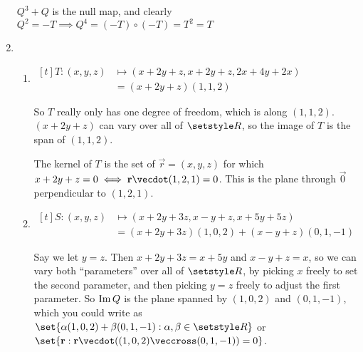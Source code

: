 \documentclass[fleqn,a4paper,11pt]{article}
\begin{document}
\begin{enumerate}[label=\textbf{\arabic*.}]
    \(Q^3 + Q\) is the null map, and clearly
    \(Q^2 = -T \implies Q^4 = (-T) \circ (-T) = T^2 = T\)
   \item
    \begin{enumerate}[label=(\alph*)]
     \item \(
      \begin{aligned}[t]
       T : (x, y, z) &\mapsto (x + 2y + z, x + 2y + z, 2x + 4y + 2x) \\
                     &= (x + 2y + z)(1, 1, 2)
      \end{aligned} \)

      So \(T\) really only has one degree of freedom, which is along
      \((1, 1, 2)\). \((x + 2y + z)\) can vary over all of \(\Reals\), so the
      image of \(T\) is the span of \((1, 1, 2)\).

      The kernel of \(T\) is the set of \(\vec r = (x, y, z)\) for which
      \(x + 2y + z = 0 \iff \vec r \vecdot (1, 2, 1) = 0\). This is the plane
      through \(\vec 0\) perpendicular to \((1, 2, 1)\).
     \item \(
      \begin{aligned}[t]
       S: (x, y, z) &\mapsto (x + 2y + 3z, x - y + z, x + 5y + 5z) \\
                    &= (x + 2y + 3z)(1, 0, 2) + (x - y + z)(0, 1, -1)
      \end{aligned} \)

      Say we let \(y = z\). Then \(x + 2y + 3z = x + 5y\) and \(x - y + z = x\),
      so we can vary both ``parameters'' over all of \(\Reals\), by picking
      \(x\) freely to set the second parameter, and then picking \(y = z\)
      freely to adjust the first parameter. So \(\operatorname{Im} Q\) is the plane spanned
      by \((1, 0, 2)\) and \((0, 1, -1)\), which you could write as
      \(\set{\alpha (1, 0, 2) + \beta (0, 1, -1) : \alpha, \beta \in \Reals}\)
      or \(\set{\vec r : \vec r \vecdot ((1, 0, 2) \veccross (0, 1, -1)) = 0}\).


\end{enumerate}
\end{enumerate}
\end{document}
